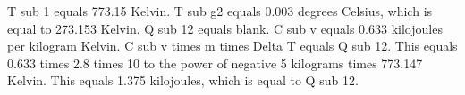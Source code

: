 T sub 1 equals 773.15 Kelvin. T sub g2 equals 0.003 degrees Celsius, which is equal to 273.153 Kelvin. Q sub 12 equals blank. C sub v equals 0.633 kilojoules per kilogram Kelvin. C sub v times m times Delta T equals Q sub 12. This equals 0.633 times 2.8 times 10 to the power of negative 5 kilograms times 773.147 Kelvin. This equals 1.375 kilojoules, which is equal to Q sub 12.
